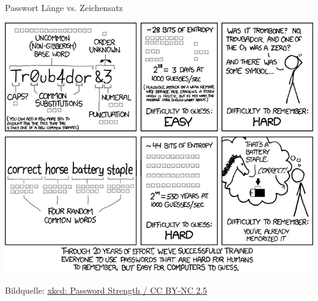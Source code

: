 \begin{frame}{Passwort Länge vs. Zeichensatz}
  \begin{center}
    \includegraphics[width=0.99\textheight]{images/password_strength.png}\\
  \end{center}
  \tiny Bildquelle: \href{http://xkcd.com/936/}{xkcd: Password Strength / CC BY-NC 2.5}
\end{frame}

